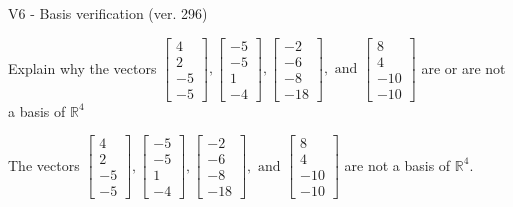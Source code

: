 \begin{exercise}
  \begin{exerciseTitle}V6 - Basis verification (ver. 296)\end{exerciseTitle}
  \begin{exerciseStatement}
    Explain why the vectors \(\left[\begin{array}{r}
4 \\
2 \\
-5 \\
-5
\end{array}\right] , \left[\begin{array}{r}
-5 \\
-5 \\
1 \\
-4
\end{array}\right] , \left[\begin{array}{r}
-2 \\
-6 \\
-8 \\
-18
\end{array}\right] , \text{ and } \left[\begin{array}{r}
8 \\
4 \\
-10 \\
-10
\end{array}\right]\) are or are not a basis of \(\mathbb{R}^4\)	


  \end{exerciseStatement}
  \begin{exerciseAnswer}
   The vectors \(\left[\begin{array}{r}
4 \\
2 \\
-5 \\
-5
\end{array}\right] , \left[\begin{array}{r}
-5 \\
-5 \\
1 \\
-4
\end{array}\right] , \left[\begin{array}{r}
-2 \\
-6 \\
-8 \\
-18
\end{array}\right] , \text{ and } \left[\begin{array}{r}
8 \\
4 \\
-10 \\
-10
\end{array}\right]\) 
  	 are not  a basis of \(\mathbb{R}^4\).
  


  \end{exerciseAnswer}
\end{exercise}